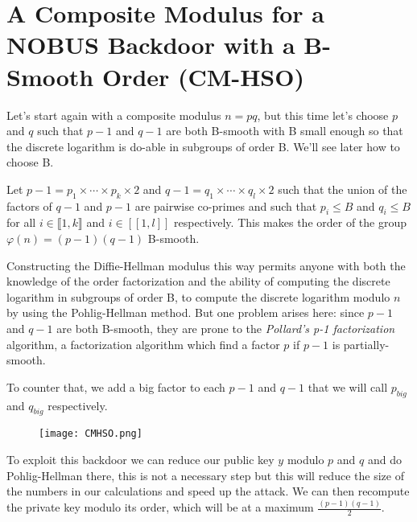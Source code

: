 \documentclass[a4paper,11pt,twocolumn]{article}
\begin{document}

\section{A Composite Modulus for a NOBUS Backdoor with a B-Smooth Order (CM-HSO)}

Let's start again with a composite modulus $n= pq$, but this time let's choose $p$ and $q$ such that $p-1$ and $q-1$ are both B-smooth with B small enough so that the discrete logarithm is do-able in subgroups of order B. We'll see later how to choose B.

Let $p-1 = p_1 \times \cdots \times p_k \times 2$ and $q-1 = q_1 \times \cdots \times q_l \times 2$ such that the union of the factors of $q-1$ and $p-1$ are pairwise co-primes and such that $p_i \leq B$ and $q_i \leq B$ for all $i \in \llbracket 1,k \rrbracket$ and $i \in [[1,l]]$ respectively. This makes the order of the group $\varphi(n) = (p-1)(q-1)$ B-smooth.

Constructing the Diffie-Hellman modulus this way permits anyone with both the knowledge of the order factorization and the ability of computing the discrete logarithm in subgroups of order B, to compute the discrete logarithm modulo $n$ by using the Pohlig-Hellman method. But one problem arises here: since $p-1$ and $q-1$ are both B-smooth, they are prone to the \emph{Pollard's p-1 factorization} algorithm, a factorization algorithm which find a factor $p$ if $p-1$ is partially-smooth.

To counter that, we add a big factor to each $p-1$ and $q-1$ that we will call $p_{big}$ and $q_{big}$ respectively. 

\begin{figure}[H]
\centering
\texttt{[image: CMHSO.png]}
\end{figure}

To exploit this backdoor we can reduce our public key $y$ modulo $p$ and $q$ and do Pohlig-Hellman there, this is not a necessary step but this will reduce the size of the numbers in our calculations and speed up the attack. We can then recompute the private key modulo its order, which will be at a maximum $\frac{(p-1)(q-1)}{2}$.
\end{document}
